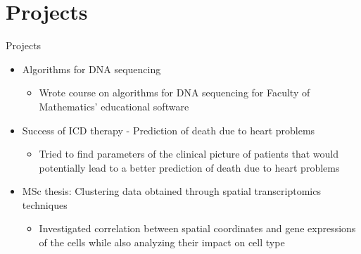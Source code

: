\documentclass{beamer}
\begin{document}
\section{Projects}
\begin{frame}{Projects}

\begin{itemize}
    \item<1-> Algorithms for DNA sequencing
    \begin{itemize}
    \item<2-> [] Wrote course on algorithms for DNA sequencing for Faculty of Mathematics’ educational software
    \end{itemize}
    \item<3-> Success of ICD therapy - Prediction of death due to heart problems
    \begin{itemize}
    \item<4-> [] Tried to find parameters of the clinical picture of patients that would potentially lead to a better prediction of death due to heart problems
    \end{itemize}
    \item<5-> MSc thesis: Clustering data obtained through spatial transcriptomics techniques
    \begin{itemize}
    \item<6-> [] Investigated correlation between spatial coordinates and gene expressions of the cells while also analyzing their impact on cell type
    \end{itemize}
\end{itemize}

\end{frame}


\end{document}

